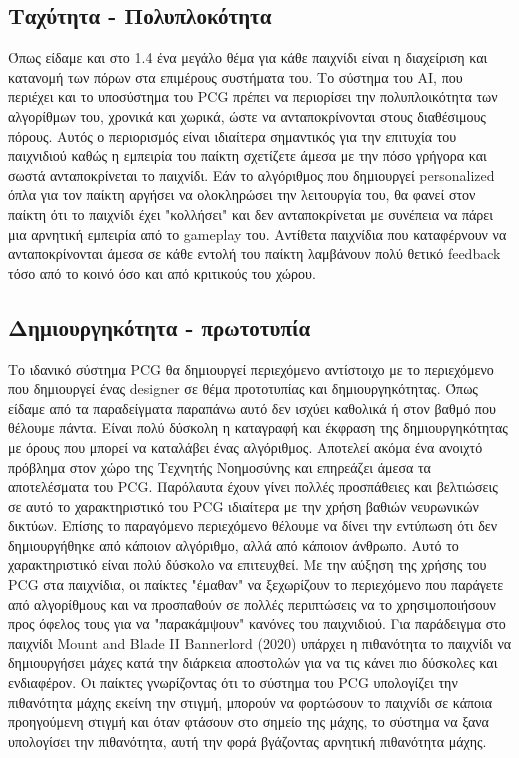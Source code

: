\subsection{Ταχύτητα - Πολυπλοκότητα} Όπως είδαμε και στο 1.4 ένα μεγάλο θέμα για κάθε παιχνίδι είναι η διαχείριση και κατανομή των πόρων στα επιμέρους συστήματα του. Το σύστημα του AI, που περιέχει και το υποσύστημα του PCG πρέπει να περιορίσει την πολυπλοικότητα των αλγορίθμων του, χρονικά και χωρικά, ώστε να ανταποκρίνονται στους διαθέσιμους πόρους. Αυτός ο περιορισμός είναι ιδιαίτερα σημαντικός για την επιτυχία του παιχνιδιού καθώς η εμπειρία του παίκτη σχετίζετε άμεσα με την πόσο γρήγορα και σωστά ανταποκρίνεται το παιχνίδι. Εάν το αλγόριθμος που δημιουργεί personalized όπλα για τον παίκτη αργήσει να ολοκληρώσει την λειτουργία του, θα φανεί στον παίκτη ότι το παιχνίδι έχει "κολλήσει" και δεν ανταποκρίνεται με συνέπεια να πάρει μια αρνητική εμπειρία από το gameplay του. Αντίθετα παιχνίδια που καταφέρνουν να ανταποκρίνονται άμεσα σε κάθε εντολή του παίκτη λαμβάνουν πολύ θετικό feedback τόσο από το κοινό όσο και από κριτικούς του χώρου.

\subsection{Δημιουργηκότητα - πρωτοτυπία} Το ιδανικό σύστημα PCG θα δημιουργεί περιεχόμενο αντίστοιχο με το περιεχόμενο που δημιουργεί ένας designer σε θέμα προτοτυπίας και δημιουργηκότητας. Όπως είδαμε από τα παραδείγματα παραπάνω αυτό δεν ισχύει καθολικά ή στον βαθμό που θέλουμε πάντα. Είναι πολύ δύσκολη η καταγραφή και έκφραση της δημιουργηκότητας με όρους που μπορεί να καταλάβει ένας αλγόριθμος. Αποτελεί ακόμα ένα ανοιχτό πρόβλημα στον χώρο της Τεχνητής Νοημοσύνης και επηρεάζει άμεσα τα αποτελέσματα του PCG. Παρόλαυτα έχουν γίνει πολλές προσπάθειες και βελτιώσεις σε αυτό το χαρακτηριστικό του PCG ιδιαίτερα με την χρήση βαθιών νευρωνικών δικτύων. Επίσης το παραγόμενο περιεχόμενο θέλουμε να δίνει την εντύπωση ότι δεν δημιουργήθηκε από κάποιον αλγόριθμο, αλλά από κάποιον άνθρωπο. Αυτό το χαρακτηριστικό είναι πολύ δύσκολο να επιτευχθεί. Με την αύξηση της χρήσης του PCG στα παιχνίδια, οι παίκτες "έμαθαν" να ξεχωρίζουν το περιεχόμενο που παράγετε από αλγορίθμους και να προσπαθούν σε πολλές περιπτώσεις να το χρησιμοποιήσουν προς όφελος τους για να "παρακάμψουν" κανόνες του παιχνιδιού. Για παράδειγμα στο παιχνίδι Mount and Blade II Bannerlord (2020) υπάρχει η πιθανότητα το παιχνίδι να δημιουργήσει μάχες κατά την διάρκεια αποστολών για να τις κάνει πιο δύσκολες και ενδιαφέρον. Οι παίκτες γνωρίζοντας ότι το σύστημα του PCG υπολογίζει την πιθανότητα μάχης εκείνη την στιγμή, μπορούν να φορτώσουν το παιχνίδι σε κάποια προηγούμενη στιγμή και όταν φτάσουν στο σημείο της μάχης, το σύστημα να ξανα υπολογίσει την πιθανότητα, αυτή την φορά βγάζοντας αρνητική πιθανότητα μάχης. 

